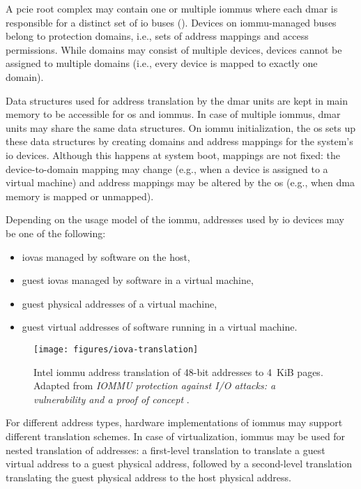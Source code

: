 A \ac{pcie} root complex may contain one or multiple \acp{iommu} where each
\ac{dmar} is responsible for a distinct set of \ac{io} buses
(). Devices on \ac{iommu}-managed buses belong to protection
domains, i.e., sets of address mappings and access permissions. While domains
may consist of multiple devices, devices cannot be assigned to multiple domains
(i.e., every device is mapped to exactly one domain).

Data structures used for address translation by the \ac{dmar} units are kept in
main memory to be accessible for \ac{os} and \acp{iommu}. In case of multiple
\acp{iommu}, \ac{dmar} units may share the same data structures. On \ac{iommu}
initialization, the \ac{os} sets up these data structures by creating domains
and address mappings for the system's \ac{io} devices. Although this happens at
system boot, mappings are not fixed: the device-to-domain mapping may change
(e.g., when a device is assigned to a virtual machine) and address mappings may
be altered by the \ac{os} (e.g., when \ac{dma} memory is mapped or unmapped).

Depending on the usage model of the \ac{iommu}, addresses used by \ac{io}
devices may be one of the following:

\begin{itemize}
    \item \acp{iova} managed by software on the host,
    \item guest \acp{iova} managed by software in a virtual machine,
    \item guest physical addresses of a virtual machine,
    \item guest virtual addresses of software running in a virtual machine.
\end{itemize}

\begin{figure}[!b]
    \centering
    \texttt{[image: figures/iova-translation]}
    \caption{Intel \acs{iommu} address translation of 48-bit addresses to 4~KiB
    pages. Adapted from \textit{IOMMU protection against I/O attacks: a
    vulnerability and a proof of concept} \cite{morgan2018iommu}.}
    \label{fig:translation}
\end{figure}

For different address types, hardware implementations of \acp{iommu} may support
different translation schemes. In case of virtualization, \acp{iommu} may be
used for nested translation of addresses: a first-level translation to translate
a guest virtual address to a guest physical address, followed by a second-level
translation translating the guest physical address to the host physical address.

